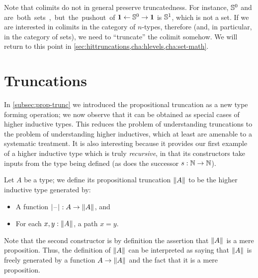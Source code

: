 %

\begin{rmk}
  Note that colimits do not in general preserve truncatedness.
  For instance, $\mathbb{S}^0$ and \unit are both sets, but the pushout of $\mathbf{1} \leftarrow \mathbb{S}^0 \to \mathbf{1}$ is $\mathbb{S}^1$, which is not a set.
  If we are interested in colimits in the category of $n$-types, therefore (and, in particular, in the category of sets), we need to ``truncate'' the colimit somehow.
  We will return to this point in \autoref{sec:hittruncations,cha:hlevels,cha:set-math}.
\end{rmk}


\section{Truncations}
\label{sec:hittruncations}

%
In \autoref{subsec:prop-trunc} we introduced the propositional truncation as a new type forming operation;
we now observe that it can be obtained as special cases of higher inductive types.
This reduces the problem of understanding truncations to the problem of understanding higher inductives, which at least are amenable to a systematic treatment.
It is also interesting because it provides our first example of a higher inductive type which is truly \emph{recursive}, in that its constructors take inputs from the type being defined (as does the successor $s:\mathbb{N}\to\mathbb{N}$).

Let $A$ be a type; we define its propositional truncation $\mathopen{}\left\Vert A\right\Vert_{}\mathclose{}$ to be the higher inductive type generated by:
\begin{itemize}
\item A function $|\mathord{\hspace{1pt}\text{--}\hspace{1pt}}|_{} : A \to \mathopen{}\left\Vert A\right\Vert_{}\mathclose{}$, and
\item For each $x,y:\mathopen{}\left\Vert A\right\Vert_{}\mathclose{}$, a path $x=y$.
\end{itemize}
Note that the second constructor is by definition the assertion that $\mathopen{}\left\Vert A\right\Vert_{}\mathclose{}$ is a mere proposition.
Thus, the definition of $\mathopen{}\left\Vert A\right\Vert_{}\mathclose{}$ can be interpreted as saying that $\mathopen{}\left\Vert A\right\Vert_{}\mathclose{}$ is freely generated by a function $A\to\mathopen{}\left\Vert A\right\Vert_{}\mathclose{}$ and the fact that it is a mere proposition.

